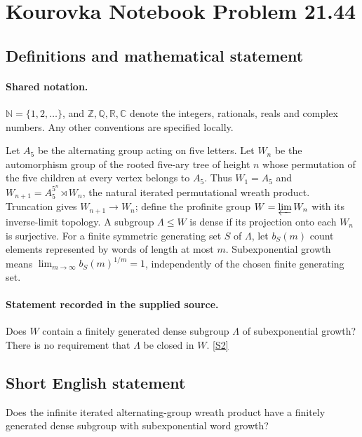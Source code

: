 \documentclass[11pt]{article}
\newcommand{\sref}[2]{\hyperlink{source:#1:#2}{[S#2]}}
\begin{document}
\section{Kourovka Notebook Problem 21.44}\label{statement}

\subsection{Definitions and mathematical statement}

\paragraph{Shared notation.}$\mathbb N=\{1,2,\ldots\}$, and $\mathbb Z,\mathbb Q,\mathbb R,\mathbb C$ denote the integers, rationals, reals and complex numbers. Any other conventions are specified locally.


Let $A_5$ be the alternating group acting on five letters. Let $W_n$ be the automorphism group of the rooted five-ary tree of height $n$ whose permutation of the five children at every vertex belongs to $A_5$. Thus $W_1=A_5$ and $W_{n+1}=A_5^{5^n}\rtimes W_n$, the natural iterated permutational wreath product. Truncation gives $W_{n+1}\to W_n$; define the profinite group $W=\varprojlim W_n$ with its inverse-limit topology. A subgroup $\Lambda\leq W$ is dense if its projection onto each $W_n$ is surjective. For a finite symmetric generating set $S$ of $\Lambda$, let $b_S(m)$ count elements represented by words of length at most $m$. Subexponential growth means $\lim_{m\to\infty}b_S(m)^{1/m}=1$, independently of the chosen finite generating set.
\paragraph{Statement recorded in the supplied source.}
Does $W$ contain a finitely generated dense subgroup $\Lambda$ of subexponential growth? There is no requirement that $\Lambda$ be closed in $W$. \sref{statement}{2}
\subsection{Short English statement}
Does the infinite iterated alternating-group wreath product have a finitely generated dense subgroup with subexponential word growth?
\end{document}
